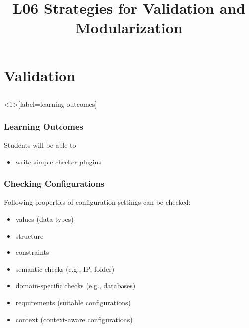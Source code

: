 

\title{L06 Strategies for Validation and Modularization}




\section{Validation}
\subsection{}

\begin{frame}<1>[label=learning outcomes]
	\frametitle{Learning Outcomes}
	Students will be able to
	\begin{itemize}
	\item write simple checker plugins.
	\end{itemize}
\end{frame}

\begin{frame}
	\frametitle{Checking Configurations}

	Following properties of configuration settings can be checked:

	\begin{itemize}[<+-| alert@+>]
	\item values (data types)
	\item structure
	\item constraints
	\item semantic checks (e.g., IP, folder)
	\item domain-specific checks (e.g., databases)
	\item requirements (suitable configurations)
	\item context (context-aware configurations)
	\end{itemize}
\end{frame}

